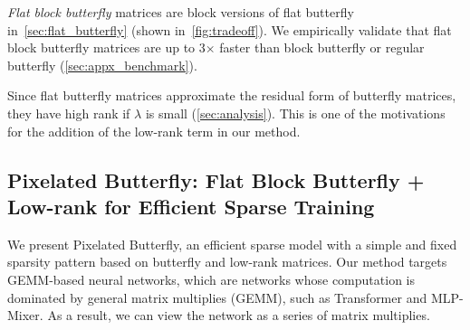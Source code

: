 \emph{Flat block butterfly} matrices are block versions of flat butterfly in~\cref{sec:flat_butterfly} (shown in~\cref{fig:tradeoff}).
We empirically validate that flat block butterfly matrices are up to 3$\times$
faster than block butterfly or regular butterfly (\cref{sec:appx_benchmark}).

Since flat butterfly matrices approximate the residual form of butterfly
matrices, they have high rank if $\lambda$ is small (\cref{sec:analysis}).
This is one of the motivations for the addition of the low-rank term in our
method.

\subsection{Pixelated Butterfly: Flat Block Butterfly + Low-rank for Efficient Sparse Training}
\label{sec:method}

We present Pixelated Butterfly, an efficient sparse model with a simple and fixed sparsity
pattern based on butterfly and low-rank matrices.
Our method targets GEMM-based neural networks, which are networks whose computation is dominated by general matrix multiplies (GEMM), such as Transformer and MLP-Mixer.
As a result, we can view the network as a series of matrix multiplies.

